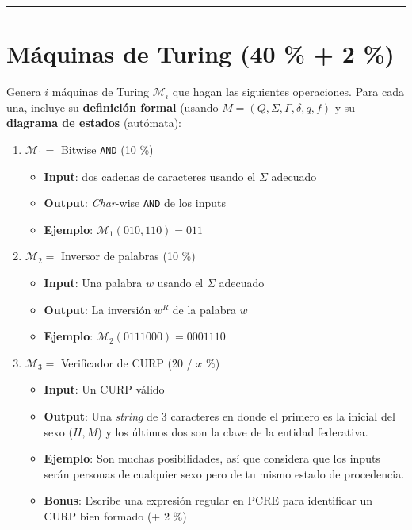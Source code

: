 \documentclass[8pt, onside]{article}
\begin{document}
\rule{\textwidth}{0.1mm}

\section{Máquinas de Turing (40 \% + 2 \%)}

Genera $i$ máquinas de Turing $\mathcal{M}_i$ que hagan las siguientes operaciones.
Para cada una, incluye su \textbf{definición formal} (usando $M = (Q,\Sigma,\Gamma,\delta,q,f)$ y su \textbf{diagrama de estados} (autómata):

\begin{enumerate}[label=\tt \alph*)]
    \itemsep0em
    \item $\mathcal{M}_1 =$ Bitwise \texttt{AND} (10 \%)
    \begin{itemize}
        \item \textbf{Input}: dos cadenas de caracteres usando el $\Sigma$ adecuado
        \item \textbf{Output}: \textit{Char}-wise \texttt{AND} de los inputs
        \item \textbf{Ejemplo}: $\mathcal{M}_1(010,110) = 011$
    \end{itemize}
    \pagebreak
    \item $\mathcal{M}_2 = $ Inversor de palabras (10 \%)
    \begin{itemize}
        \item \textbf{Input}: Una palabra $w$ usando el $\Sigma$ adecuado
        \item \textbf{Output}: La inversión $w^R$ de la palabra $w$
        \item \textbf{Ejemplo}: $\mathcal{M}_2(0111000) = 0001110$
    \end{itemize}
    \item $\mathcal{M}_3 = $ Verificador de CURP (20 / $x$ \%)
    \begin{itemize}
        \item \textbf{Input}: Un CURP válido
        \item \textbf{Output}: Una \textit{string} de 3 caracteres en donde el primero es la inicial del sexo ($H, M$) y los últimos dos son la clave de la entidad federativa.
        \item \textbf{Ejemplo}: Son muchas posibilidades, así que considera que los inputs serán personas de cualquier sexo pero de tu mismo estado de procedencia.
        \item \textbf{Bonus}: Escribe una expresión regular en PCRE para identificar un CURP bien formado (+ 2 \%)
    \end{itemize}
\end{enumerate}
\end{document}
